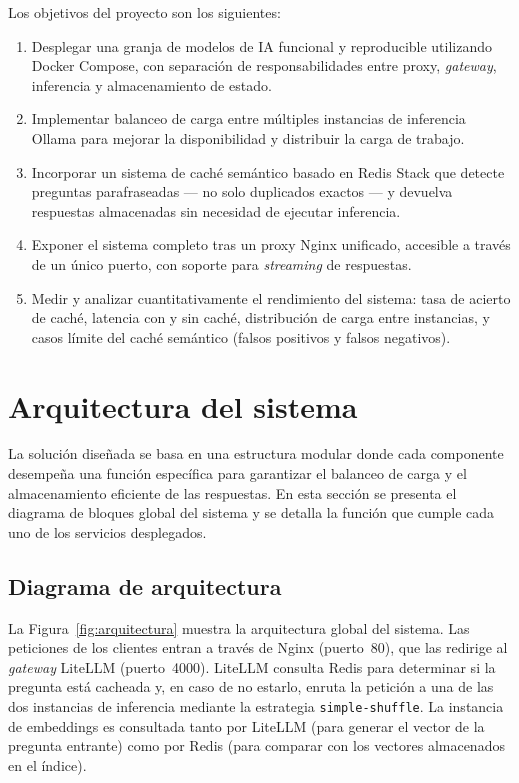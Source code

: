 Los objetivos del proyecto son los siguientes:

\begin{enumerate}
    \item Desplegar una granja de modelos de IA funcional y reproducible utilizando Docker Compose, con separación de responsabilidades entre proxy, \textit{gateway}, inferencia y almacenamiento de estado.
    
    \item Implementar balanceo de carga entre múltiples instancias de inferencia Ollama para mejorar la disponibilidad y distribuir la carga de trabajo.
    
    \item Incorporar un sistema de caché semántico basado en Redis Stack que detecte preguntas parafraseadas — no solo duplicados exactos — y devuelva respuestas almacenadas sin necesidad de ejecutar inferencia.
    
    \item Exponer el sistema completo tras un proxy Nginx unificado, accesible a través de un único puerto, con soporte para \textit{streaming} de respuestas.
    
    \item Medir y analizar cuantitativamente el rendimiento del sistema: tasa de acierto de caché, latencia con y sin caché, distribución de carga entre instancias, y casos límite del caché semántico (falsos positivos y falsos negativos).
\end{enumerate}

\section{Arquitectura del sistema}

La solución diseñada se basa en una estructura modular donde cada componente desempeña una función específica para garantizar el balanceo de carga y el almacenamiento eficiente de las respuestas. En esta sección se presenta el diagrama de bloques global del sistema y se detalla la función que cumple cada uno de los servicios desplegados.

\subsection{Diagrama de arquitectura}

La Figura~\ref{fig:arquitectura} muestra la arquitectura global del sistema. Las peticiones de los clientes entran a través de Nginx (puerto~80), que las redirige al \textit{gateway} LiteLLM (puerto~4000). LiteLLM consulta Redis para determinar si la pregunta está cacheada y, en caso de no estarlo, enruta la petición a una de las dos instancias de inferencia mediante la estrategia \texttt{simple-shuffle}. La instancia de embeddings es consultada tanto por LiteLLM (para generar el vector de la pregunta entrante) como por Redis (para comparar con los vectores almacenados en el índice).

